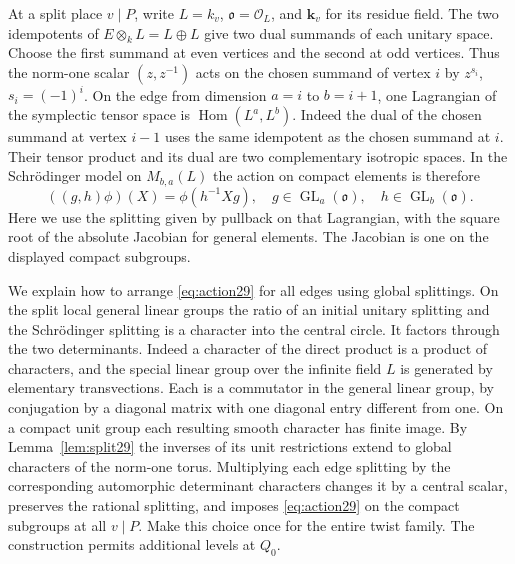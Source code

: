 \documentclass[a4paper,11pt]{article}
\theoremstyle{definition}
\theoremstyle{remark}
\numberwithin{equation}{section}
\newcommand{\GL}{\operatorname{GL}}
\newcommand{\OO}{\mathcal O}
\begin{document}
At a split place \(v\mid P\), write \(L=k_v\), \(\mathfrak o=\OO_L\), and \(\mathbf k_v\) for its residue field. The two idempotents of \(E\otimes_k L=L\oplus L\) give two dual summands of each unitary space. Choose the first summand at even vertices and the second at odd vertices. Thus the norm-one scalar \((z,z^{-1})\) acts on the chosen summand of vertex \(i\) by \(z^{s_i}\), \(s_i=(-1)^i\). On the edge from dimension \(a=i\) to \(b=i+1\), one Lagrangian of the symplectic tensor space is
\(\operatorname{Hom}(L^a,L^b)\). Indeed the dual of the chosen summand at vertex \(i-1\) uses the same idempotent as the chosen summand at \(i\). Their tensor product and its dual are two complementary isotropic spaces. In the Schr\"odinger model on \(M_{b,a}(L)\) the action on compact elements is therefore
\begin{equation}
       ((g,h)\phi)(X)=\phi(h^{-1}Xg),
       \quad g\in\GL_a(\mathfrak o),\quad h\in\GL_b(\mathfrak o).
       \label{eq:action29}
\end{equation}
Here we use the splitting given by pullback on that Lagrangian, with the square root of the absolute Jacobian for general elements. The Jacobian is one on the displayed compact subgroups.~\cite{XXIII-XVIII-IV-kudla29}

We explain how to arrange \eqref{eq:action29} for all edges using global splittings. On the split local general linear groups the ratio of an initial unitary splitting and the Schr\"odinger splitting is a character into the central circle. It factors through the two determinants. Indeed a character of the direct product is a product of characters, and the special linear group over the infinite field \(L\) is generated by elementary transvections. Each is a commutator in the general linear group, by conjugation by a diagonal matrix with one diagonal entry different from one. On a compact unit group each resulting smooth character has finite image. By Lemma~\ref{lem:split29} the inverses of its unit restrictions extend to global characters of the norm-one torus. Multiplying each edge splitting by the corresponding automorphic determinant characters changes it by a central scalar, preserves the rational splitting, and imposes \eqref{eq:action29} on the compact subgroups at all \(v\mid P\). Make this choice once for the entire twist family. The construction permits additional levels at \(Q_0\).
\end{document}
